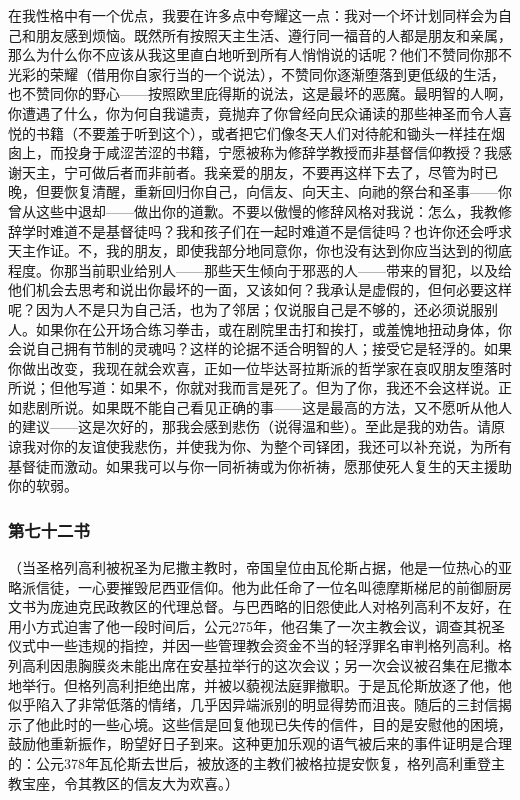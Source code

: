 在我性格中有一个优点，我要在许多点中夸耀这一点：我对一个坏计划同样会为自己和朋友感到烦恼。既然所有按照天主生活、遵行同一福音的人都是朋友和亲属，那么为什么你不应该从我这里直白地听到所有人悄悄说的话呢？他们不赞同你那不光彩的荣耀（借用你自家行当的一个说法），不赞同你逐渐堕落到更低级的生活，也不赞同你的野心——按照欧里庇得斯的说法，这是最坏的恶魔。最明智的人啊，你遭遇了什么，你为何自我谴责，竟抛弃了你曾经向民众诵读的那些神圣而令人喜悦的书籍（不要羞于听到这个），或者把它们像冬天人们对待舵和锄头一样挂在烟囱上，而投身于咸涩苦涩的书籍，宁愿被称为修辞学教授而非基督信仰教授？我感谢天主，宁可做后者而非前者。我亲爱的朋友，不要再这样下去了，尽管为时已晚，但要恢复清醒，重新回归你自己，向信友、向天主、向祂的祭台和圣事——你曾从这些中退却——做出你的道歉。不要以傲慢的修辞风格对我说：怎么，我教修辞学时难道不是基督徒吗？我和孩子们在一起时难道不是信徒吗？也许你还会呼求天主作证。不，我的朋友，即使我部分地同意你，你也没有达到你应当达到的彻底程度。你那当前职业给别人——那些天生倾向于邪恶的人——带来的冒犯，以及给他们机会去思考和说出你最坏的一面，又该如何？我承认是虚假的，但何必要这样呢？因为人不是只为自己活，也为了邻居；仅说服自己是不够的，还必须说服别人。如果你在公开场合练习拳击，或在剧院里击打和挨打，或羞愧地扭动身体，你会说自己拥有节制的灵魂吗？这样的论据不适合明智的人；接受它是轻浮的。如果你做出改变，我现在就会欢喜，正如一位毕达哥拉斯派的哲学家在哀叹朋友堕落时所说；但他写道：如果不，你就对我而言是死了。但为了你，我还不会这样说。正如悲剧所说。如果既不能自己看见正确的事——这是最高的方法，又不愿听从他人的建议——这是次好的，那我会感到悲伤（说得温和些）。至此是我的劝告。请原谅我对你的友谊使我悲伤，并使我为你、为整个司铎团，我还可以补充说，为所有基督徒而激动。如果我可以与你一同祈祷或为你祈祷，愿那使死人复生的天主援助你的软弱。\par


\subsubsection{第七十二书}

（当圣格列高利被祝圣为尼撒主教时，帝国皇位由瓦伦斯占据，他是一位热心的亚略派信徒，一心要摧毁尼西亚信仰。他为此任命了一位名叫德摩斯梯尼的前御厨房文书为庞迪克民政教区的代理总督。与巴西略的旧怨使此人对格列高利不友好，在用小方式迫害了他一段时间后，公元275年，他召集了一次主教会议，调查其祝圣仪式中一些违规的指控，并因一些管理教会资金不当的轻浮罪名审判格列高利。格列高利因患胸膜炎未能出席在安基拉举行的这次会议；另一次会议被召集在尼撒本地举行。但格列高利拒绝出席，并被以藐视法庭罪撤职。于是瓦伦斯放逐了他，他似乎陷入了非常低落的情绪，几乎因异端派别的明显得势而沮丧。随后的三封信揭示了他此时的一些心境。这些信是回复他现已失传的信件，目的是安慰他的困境，鼓励他重新振作，盼望好日子到来。这种更加乐观的语气被后来的事件证明是合理的：公元378年瓦伦斯去世后，被放逐的主教们被格拉提安恢复，格列高利重登主教宝座，令其教区的信友大为欢喜。）\par

